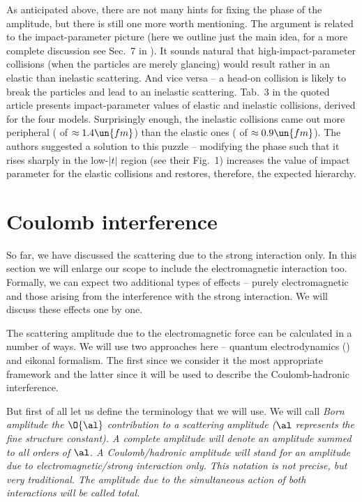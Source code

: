 As anticipated above, there are not many hints for fixing the phase of the amplitude, but there is still one more worth mentioning. The argument is related to the impact-parameter picture (here we outline just the main idea, for a more complete discussion see Sec.~7 in ). It sounds natural that high-impact-parameter collisions (when the particles are merely glancing) would result rather in an elastic than inelastic scattering. And vice versa -- a head-on collision is likely to break the particles and lead to an inelastic scattering. Tab.~3 in the quoted article presents  impact-parameter values of elastic and inelastic collisions, derived for the four models. Surprisingly enough, the inelastic collisions came out more peripheral ( of $\approx 1.4\un{fm}$) than the elastic ones ( of $\approx 0.9\un{fm}$). The authors suggested a solution to this puzzle -- modifying the phase such that it rises sharply in the low-$|t|$ region (see their Fig.~1) increases the  value of impact parameter for the elastic collisions and restores, therefore, the expected hierarchy.

\section[el coulomb]{Coulomb interference}

So far, we have discussed the scattering due to the strong interaction only. In this section we will enlarge our scope to include the electromagnetic interaction too. Formally, we can expect two additional types of effects -- purely electromagnetic and those arising from the interference with the strong interaction. We will discuss these effects one by one.

The scattering amplitude due to the electromagnetic force can be calculated in a number of ways. We will use two approaches here -- quantum electrodynamics () and eikonal formalism. The first since we consider it the most appropriate framework and the latter since it will be used to describe the Coulomb-hadronic interference.

But first of all let us define the terminology that we will use. We will call \em{Born amplitude} the $\O{\al}$ contribution to a scattering amplitude ($\al$ represents the fine structure constant). A \em{complete} amplitude will denote an amplitude summed to all orders of $\al$. A \em{Coulomb}/\em{hadronic} amplitude will stand for an amplitude due to electromagnetic/strong interaction only. This notation is not precise, but very traditional. The amplitude due to the simultaneous action of both interactions will be called \em{total}.


